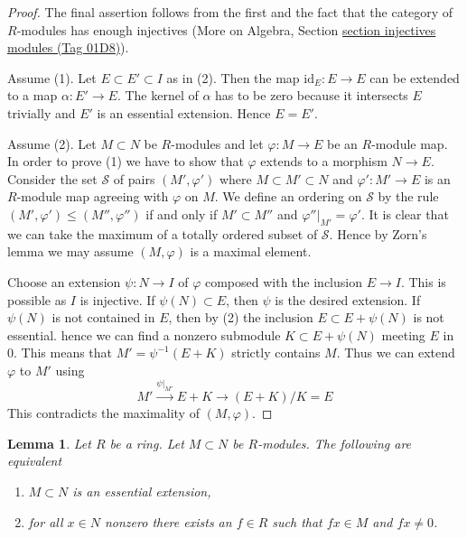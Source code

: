\documentclass{amsart}
\theoremstyle{plain}
\newtheorem{lemma}[subsection]{Lemma}
\theoremstyle{definition}
\theoremstyle{remark}
\numberwithin{equation}{subsection}
\begin{document}
\begin{proof}
The final assertion follows from the first and the fact that the
category of $R$-modules has enough injectives
(More on Algebra, Section \href{https://stacks.math.columbia.edu/tag/01D8}{section injectives modules (Tag 01D8)}).

\medskip\noindent
Assume (1). Let $E \subset E' \subset I$ as in (2).
Then the map $\text{id}_E : E \to E$ can be extended
to a map $\alpha : E' \to E$. The kernel of $\alpha$ has to be
zero because it intersects $E$ trivially and $E'$ is an essential
extension. Hence $E = E'$.

\medskip\noindent
Assume (2). Let $M \subset N$ be $R$-modules and let $\varphi : M \to E$
be an $R$-module map. In order to prove (1) we have to show that
$\varphi$ extends to a morphism $N \to E$. Consider the set $\mathcal{S}$
of pairs
$(M', \varphi')$ where $M \subset M' \subset N$ and $\varphi' : M' \to E$
is an $R$-module map agreeing with $\varphi$ on $M$. We define an ordering
on $\mathcal{S}$ by the rule $(M', \varphi') \leq (M'', \varphi'')$
if and only if $M' \subset M''$ and $\varphi''|_{M'} = \varphi'$.
It is clear that we can take the maximum of a totally ordered subset
of $\mathcal{S}$. Hence by Zorn's lemma we may assume $(M, \varphi)$
is a maximal element.

\medskip\noindent
Choose an extension $\psi : N \to I$ of $\varphi$ composed
with the inclusion $E \to I$. This is possible as $I$ is injective.
If $\psi(N) \subset E$, then $\psi$ is the desired extension.
If $\psi(N)$ is not contained in $E$, then by (2) the inclusion
$E \subset E + \psi(N)$ is not essential. hence
we can find a nonzero submodule $K \subset E + \psi(N)$ meeting $E$ in $0$.
This means that $M' = \psi^{-1}(E + K)$ strictly contains $M$.
Thus we can extend $\varphi$ to $M'$ using
$$
M' \xrightarrow{\psi|_{M'}} E + K \to (E + K)/K = E
$$
This contradicts the maximality of $(M, \varphi)$.
\end{proof}


\begin{lemma}
\label{lemma-essential-extension}
Let $R$ be a ring. Let $M \subset N$ be $R$-modules. The following
are equivalent
\begin{enumerate}
\item $M \subset N$ is an essential extension,
\item for all $x \in N$ nonzero there exists an $f \in R$ such that $fx \in M$
and $fx \not = 0$.
\end{enumerate}
\end{lemma}
\end{document}
